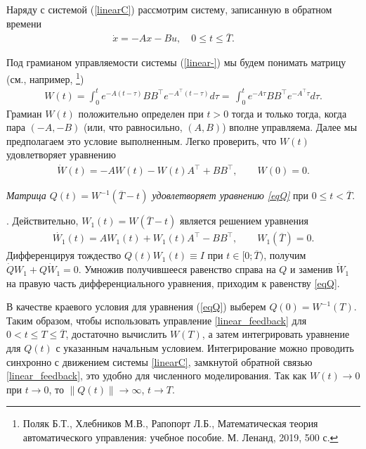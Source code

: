 \documentclass[../main.tex]{subfiles}
\begin{document}
	Наряду с системой (\ref{linearC}) рассмотрим систему, записанную в обратном времени
	\begin{gather}\label{linear-}
		\dot{x} =  -A  x - B u, \quad 0 \leqslant t \leqslant \overline{T}. \qquad 
	\end{gather}
	
	 Под грамианом управляемости  системы (\ref{linear-}) мы будем понимать   матрицу (см., например, \footnote{Поляк Б.Т., Хлебников М.В., Рапопорт Л.Б., Математическая теория автоматического управления: учебное пособие. М. Ленанд, 2019, 500 с.})
	\begin{gather}\label{gram_Stationary}
		W(t) = \int_0^t e^{-A(t-\tau)}BB^\top e^{-A^{\top}(t-\tau)} d\tau=\,\int_0^t e^{-A\tau}BB^\top e^{-A^\top{\tau}}d\tau.
	\end{gather}
	Грамиан $W(t)$ положительно определен при $t>0$ тогда и только тогда, когда пара $(-A,-B)$ (или, что равносильно, $(A,B)$) вполне управляема. Далее мы предполагаем это условие выполненным. Легко проверить, что $W(t)$ удовлетворяет уравнению
	\begin{gather*}
		\dot{W}(t) = -A W(t)-W(t) A^\top +B B^\top,  \qquad W(0) = 0.
	\end{gather*}
	\begin{utv}
	{\it Матрица $Q(t)=W^{-1}(\overline{T}-t)$ удовлетворяет уравнению {\rm \ref{eqQ}}} при $0 \leqslant t < \overline{T} $.
	\end{utv}
	\doc. Действительно, $W_1(t)=W(\overline{T}-t)$ является решением уравнения 
	\begin{gather*}
		\dot{W_1}(t) = A W_1(t)+W_1(t) A^\top -B B^\top,  \qquad W_1(\overline{T}) = 0.
	\end{gather*}
	Дифференцируя тождество $Q(t)W_1(t)\equiv I$ при $ t \in [0;\overline{T})$, получим
	$\dot{Q}W_1+Q\dot{W}_1=0 $. Умножив получившееся равенство справа на $Q$
	и заменив $\dot{W}_1$ на правую часть дифференциального уравнения, приходим к равенству 
	\eqref{eqQ}.
	
	В качестве краевого условия для уравнения (\ref{eqQ}) выберем $Q(0)=W^{-1}(T)$. Таким образом, чтобы использовать управление \eqref{linear_feedback} для $0<t \leqslant T \leqslant \overline{T}$, достаточно вычислить $W(T)$, а затем интегрировать уравнение для $Q(t)$  с указанным начальным условием. Интегрирование можно проводить синхронно с движением системы \eqref{linearC}, замкнутой обратной связью \eqref{linear_feedback}, это удобно для численного моделирования. Так как $W(t)\to 0$ при $t\to 0$, то $\|Q(t) \|\to \infty$, $t\to T$.
	
\end{document}

